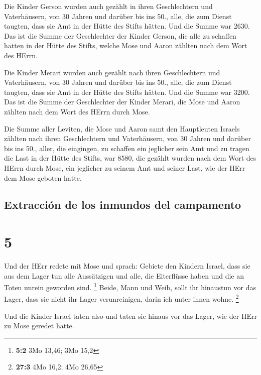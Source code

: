  Die Kinder Gerson wurden auch gezählt in ihren
Geschlechtern und Vaterhäusern,  von 30 Jahren und
darüber bis ins 50., alle, die zum Dienst taugten, dass sie Amt in der
Hütte des Stifts hätten.  Und die Summe war 2630.
 Das ist die Summe der Geschlechter der Kinder Gerson,
die alle zu schaffen hatten in der Hütte des Stifts, welche Mose und
Aaron zählten nach dem Wort des HErrn.

 Die Kinder Merari wurden auch gezählt nach ihren
Geschlechtern und Vaterhäusern,  von 30 Jahren und
darüber bis ins 50., alle, die zum Dienst taugten, dass sie Amt in der
Hütte des Stifts hätten.  Und die Summe war 3200.
 Das ist die Summe der Geschlechter der Kinder Merari,
die Mose und Aaron zählten nach dem Wort des HErrn durch Mose.

 Die Summe aller Leviten, die Mose und Aaron samt den
Hauptleuten Israels zählten nach ihren Geschlechtern und Vaterhäusern,
 von 30 Jahren und darüber bis ins 50., aller, die
eingingen, zu schaffen ein jeglicher sein Amt und zu tragen die Last in
der Hütte des Stifts,  war 8580,  die
gezählt wurden nach dem Wort des HErrn durch Mose, ein jeglicher zu
seinem Amt und seiner Last, wie der HErr dem Mose geboten hatte.

\hypertarget{extracciuxf3n-de-los-inmundos-del-campamento}{%
\subsection{Extracción de los inmundos del
campamento}\label{extracciuxf3n-de-los-inmundos-del-campamento}}

\hypertarget{section-4}{%
\section{5}\label{section-4}}

 Und der HErr redete mit Mose und sprach: 
Gebiete den Kindern Israel, dass sie aus dem Lager tun alle Aussätzigen
und alle, die Eiterflüsse haben und die an Toten unrein geworden sind.
\footnote{\textbf{5:2} 3Mo 13,46; 3Mo 15,2}  Beide, Mann
und Weib, sollt ihr hinaustun vor das Lager, dass sie nicht ihr Lager
verunreinigen, darin ich unter ihnen wohne. \footnote{\textbf{27:3} 4Mo
  16,2; 4Mo 26,65}

 Und die Kinder Israel taten also und taten sie hinaus vor
das Lager, wie der HErr zu Mose geredet hatte.

